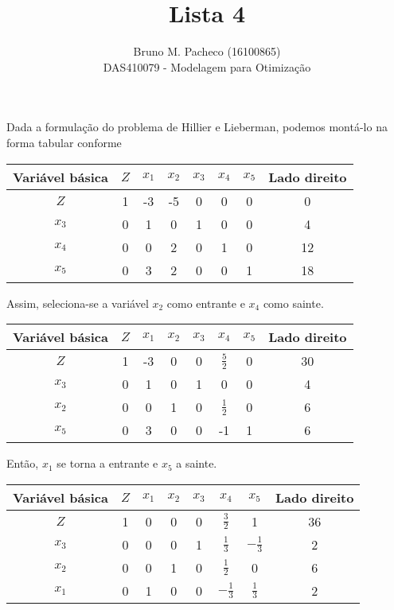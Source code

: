 \documentclass[a4paper]{report}
\begin{document}
 
\title{Lista 4}
\author{Bruno M. Pacheco (16100865)\\
DAS410079 - Modelagem para Otimização}
 
\maketitle
 

Dada a formulação do problema de Hillier e Lieberman, podemos montá-lo na forma tabular conforme 

\begin{table}[H]
    \centering
    \begin{tabular}{c | c | c | c | c | c | c | c}
    Variável básica  & $Z$ & $x_1$ & $x_2$ & $x_3$ & $x_4$  & $x_5$ & Lado direito  \\
    \hline
    $Z$ & 1 & -3 & -5 & 0 & 0 & 0 & 0 \\
    $x_3$ & 0 & 1 & 0 & 1 & 0 & 0 & 4 \\
    $x_4$ & 0 & 0 & 2 & 0 & 1 & 0 & 12 \\
    $x_5$ & 0 & 3 & 2 & 0 & 0 & 1 & 18
    \end{tabular}
\end{table}

Assim, seleciona-se a variável $x_2$ como entrante e $x_4$ como sainte.

\begin{table}[H]
    \centering
    \begin{tabular}{c | c | c | c | c | c | c | c}
    Variável básica  & $Z$ & $x_1$ & $x_2$ & $x_3$ & $x_4$  & $x_5$ & Lado direito  \\
    \hline
    $Z$ & 1 & -3 & 0 & 0 & $\frac{5}{2}$ & 0 & 30 \\
    $x_3$ & 0 & 1 & 0 & 1 & 0 & 0 & 4 \\
    $x_2$ & 0 & 0 & 1 & 0 & $\frac{1}{2}$ & 0 & 6 \\
    $x_5$ & 0 & 3 & 0 & 0 & -1 & 1 & 6
    \end{tabular}
\end{table}

Então, $x_1$ se torna a entrante e $x_5$ a sainte.

\begin{table}[H]
    \centering
    \begin{tabular}{c | c | c | c | c | c | c | c}
    Variável básica  & $Z$ & $x_1$ & $x_2$ & $x_3$ & $x_4$  & $x_5$ & Lado direito  \\
    \hline
    $Z$ & 1 & 0 & 0 & 0 & $\frac{3}{2}$ & 1 & 36 \\
    $x_3$ & 0 & 0 & 0 & 1 & $\frac{1}{3}$ & $-\frac{1}{3}$ & 2 \\
    $x_2$ & 0 & 0 & 1 & 0 & $\frac{1}{2}$ & 0 & 6 \\
    $x_1$ & 0 & 1 & 0 & 0 & $-\frac{1}{3}$ & $\frac{1}{3}$ & 2
    \end{tabular}
\end{table}
\end{document}
